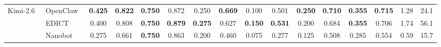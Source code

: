 \begin{table}[t]
{\begin{tabular}{ll cc cc cc cc cc cccc}
  \midrule

  \multirow{3}{*}{Kimi-2.6~\cite{kimi26}}
  & OpenClaw~\cite{openclaw} & \textbf{0.425} & \textbf{0.822} & \textbf{0.750} & 0.872 & 0.250 & \textbf{0.669} & 0.100 & 0.501 & \textbf{0.250} & \textbf{0.710} & \textbf{0.355} & \textbf{0.715} & 1.28 & 24.1 \\
  & EDICT~\cite{edict}    & 0.400 & 0.808 & \textbf{0.750} & \textbf{0.879} & \textbf{0.275} & 0.627 & \textbf{0.150} & \textbf{0.531} & 0.200 & 0.684 & \textbf{0.355} & 0.706 & 1.74 & 56.1 \\
  & Nanobot~\cite{nanobot}  & 0.275 & 0.661 & \textbf{0.750} & 0.863 & 0.200 & 0.460 & 0.075 & 0.277 & 0.125 & 0.508 & 0.285 & 0.554 & 0.59 & 15.7 \\
  

  \bottomrule
  \end{tabular} }
  \end{table}
\vspace{-8pt}





